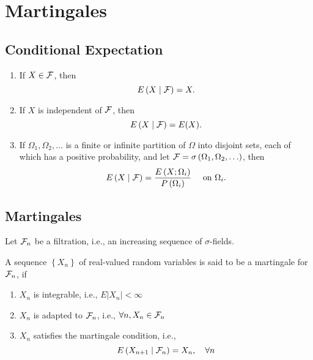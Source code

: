 \chapter{Martingales}

\section{Conditional Expectation}

\begin{definition}

\end{definition}

\begin{example}
	\begin{enumerate}
		\item If $X\in{\mathcal F}$, then
		      \begin{equation*}
			      E\left(X\mid{\mathcal F}\right)=X.
		      \end{equation*}
		\item If $X$ is independent of ${\mathcal F}$, then
		      \begin{equation*}
			      E\left(X\mid{\mathcal F}\right)=E(X).
		      \end{equation*}
		\item If $\Omega_{1}, \Omega_{2}, \ldots$ is a finite or infinite partition of $\Omega$ into disjoint sets, each of which has a positive probability, and let ${\mathcal F}=\sigma\left(\Omega_{1},\Omega_{2},\ldots\right)$, then
		      \begin{equation*}
			      E\left(X\mid{\mathcal F}\right)=\frac{E\left(X;\Omega_{i}\right)}{P\left(\Omega_{i}\right)}\quad\text { on }\Omega_{i}.
		      \end{equation*}
	\end{enumerate}
\end{example}

\begin{property}

\end{property}

\section{Martingales}

Let ${\mathcal F}_{n}$ be a filtration, i.e., an increasing sequence of $\sigma$-fields.
\begin{definition}[Martingale]
	A sequence $\left\{X_{n}\right\}$ of real-valued random variables  is said to be a martingale for ${\mathcal F}_{n}$, if
	\begin{enumerate}
		\item $X_{n}$ is integrable, i.e., $E\left|X_{n}\right|<\infty$
		\item $X_{n}$ is adapted to ${\mathcal F}_{n}$, i.e., $\forall n,X_{n}\in {\mathcal F}_{n}$
		\item $X_{n}$ satisfies the martingale condition, i.e.,
		      \begin{equation}
			      E\left(X_{n+1}\mid{\mathcal F}_{n}\right)=X_{n},\quad\forall n
		      \end{equation}
	\end{enumerate}
\end{definition}

